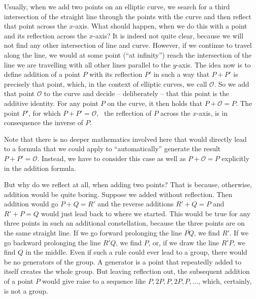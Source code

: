 \documentclass[tikz]{scrreprt}
\begin{document}
Usually, when we add two points on an elliptic curve,
we search for a third intersection of the straight line 
through the points with the curve 
and then reflect that point across
the $x$-axis. What should happen,
when we do this with a point and its reflection
across the $x$-axis? It is indeed not quite clear,
because we will not find any other intersection of line
and curve. However, if we continue to travel
along the line, we would at some point (``at infinity'')
reach the intersection of the line we are travelling
with all other lines parallel to the $y$-axis.
The idea now is to define addition of a point $P$
with its reflection $P'$ in such a way that
$P + P'$ is precisely that point, which,
in the context of elliptic curves, we call $\mathcal{O}$.
So we add that point $\mathcal{O}$ to the curve
and decide -- deliberately -- that this point is
the additive identity. For any point $P$ on the curve,
it then holds that $P + \mathcal{O} = P$.
The point $P'$, for which $P + P' = \mathcal{O}$,
\ie\ the reflection of $P$ across the $x$-axis,
is in consequence the inverse of $P$.

Note that there is no deeper mathematics involved here
that would directly lead to a formula that we could apply
to ``automatically'' generate the result
$P + P' = \mathcal{O}$. Instead, we have
to consider this case as well as $P + \mathcal{O} = P$
explicitly in the addition formula.

But why do we reflect at all, when adding two points?
That is because, otherwise, addition would
be quite boring. Suppose we added without reflection.
Then addition would go $P + Q = R'$ and the 
reverse additions $R' + Q = P$ and
$R' + P = Q$ would just lead back to where we started.
This would be true for any three points 
in such an additional constellation, because the three points
are on the same straight line. If we go forward prolonging
the line $\overline{PQ}$, we find $R'$. If we go backward
prolonging the line $\overline{R'Q}$, we find $P$, or,
if we draw the line $\overline{R'P}$, we find $Q$ in the middle.
Even if such a rule
could ever lead to a group, there would be no 
generators of the group. A generator is a point
that repeatedly added to itself creates the whole group.
But leaving reflection out, the subsequent addition of
a point $P$ would give raise to a sequence like
$P,2P,P,2P,P,\dots$, which, certainly, is not a group.
\end{document}
